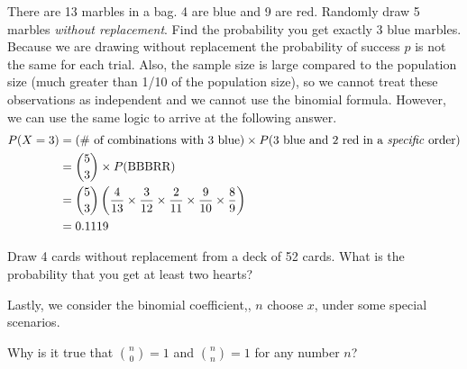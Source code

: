 \begin{examplewrap}
\begin{nexample}{There are 13 marbles in a bag. 4 are blue and 9 are red. Randomly draw 5 marbles \emph{without replacement}. Find the probability you get exactly 3 blue marbles.  Because we are drawing without replacement the probability of success $p$ is not the same for each trial.  Also, the sample size is large compared to the population size (much greater than 1/10 of the population size), so we cannot treat these observations as independent and we cannot use the binomial formula. However, we can use the same logic to arrive at the following answer. }
\begin{align*}
P(X = 3) &= (\text{\# of combinations with 3 blue})\times P(\text{3 blue and 2 red in a \emph{specific} order}) \\
&={5\choose 3}\times P(\text{BBBRR}) \\
&= {5\choose 3}\left(\frac{4}{13}\times \frac{3}{12}\times \frac{2}{11} \times \frac{9}{10} \times \frac{8}{9}\right) \\
&= 0.1119
\end{align*}
\end{nexample}
\end{examplewrap}

\begin{exercisewrap}
\begin{nexercise}
{Draw 4 cards without replacement from a deck of 52 cards.  What is the probability that you get at least two hearts?}\footnotemark
\end{nexercise}
\end{exercisewrap}

Lastly, we consider the binomial coefficient,,
$n$ choose $x$, under some special scenarios.

\begin{exercisewrap}
\begin{nexercise}
Why is it true that ${n \choose 0}=1$ and ${n \choose n}=1$
for any number $n$?\footnotemark
\end{nexercise}
\end{exercisewrap}

